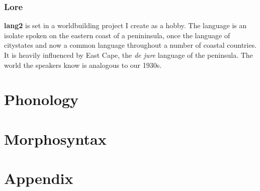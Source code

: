 \documentclass[fontsize=12pt,twoside=false,numbers=noenddot]{kaobook}
\newcommand{\langname}{\textbf{lang2}}
\begin{document}
\section{Lore}
\langname{} is set in a worldbuilding project I create as a hobby. The language is an isolate spoken on the eastern coast of a penininsula, once the language of citystates and now a common language throughout a number of coastal countries. It is heavily influenced by East Cape, the \emph{de jure} language of the peninsula. The world the speakers know is analogous to our 1930s.

\mainmatter

 \part{Phonology} 



 \part{Morphosyntax} 











 \part{Appendix} 

\appendix



\backmatter
{}

\end{document}
